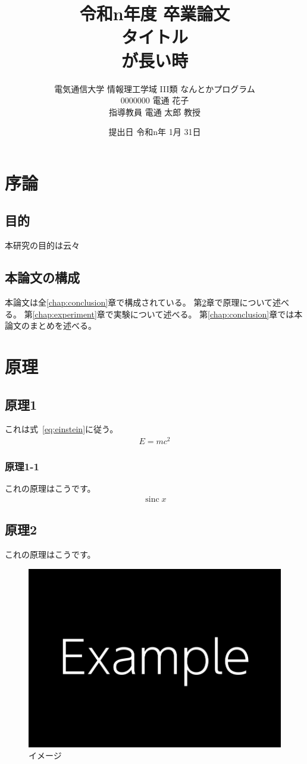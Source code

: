 \documentclass[a4paper, book, twoside, openany, fontsize = 11pt, gutter = 3cm]{jlreq}
\title{
			令和n年度 卒業論文 \\
			\huge{タイトル\\が長い時\vspace{280pt}} %
		}
\author{
			電気通信大学 情報理工学域
			I\hspace{-1.2pt}I\hspace{-1.2pt}I類 %
			なんとかプログラム \\ 
			0000000 電通 花子 \\
			指導教員 電通 太郎 教授
		}
\date{提出日 令和n年 1月 31日}
\newcommand{\eeqref}{式~\eqref}
\newcommand{\chapref}[1]{第\ref{#1}章}
\DeclareMathOperator{\sinc}{sinc} %
\begin{document}
	\frontmatter
		\maketitle
		\tableofcontents

	\mainmatter
		\chapter{序論}
			\section{目的}
				本研究の目的は云々

			\section{本論文の構成}
				本論文は全\ref{chap:conclusion}章で構成されている。
				\chapref{chap:principle}で原理について述べる。
				\chapref{chap:experiment}で実験について述べる。
				\chapref{chap:conclusion}では本論文のまとめを述べる。

		\chapter{原理} \label{chap:principle}
			\section{原理1}
				これは\eeqref{eq:einstein}に従う。
				\begin{align}
					E = mc^2 \label{eq:einstein}
				\end{align}
				\subsection{原理1-1}
					これの原理はこう\cite{uec.ac.jp:sotsuron_example}です。
					\begin{align}
						\sinc x %
					\end{align}

			\section{原理2}
				これの原理はこうです。
				\begin{figure}[H]
					\centering
					\includegraphics[width=0.5\columnwidth]{image.png}
					\caption{イメージ}
					\label{fig:image}
				\end{figure}
\end{document}
